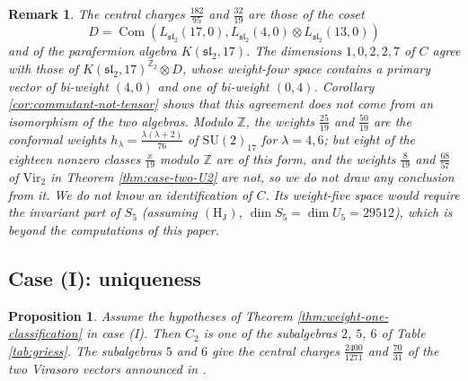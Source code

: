 \documentclass[leqno]{article}
\newcommand{\Z}{\ensuremath{\mathbb{Z}}}
\newcommand{\ot}{\otimes}
\newtheorem{prop}[thm]{Proposition}
\newtheorem{remark}[thm]{Remark}
\numberwithin{equation}{section}
\begin{document}
\begin{remark}\normalfont
\label{rem:commutant-cosets}
The central charges $\frac{182}{95}$ and $\frac{32}{19}$ are those of the coset
\[
D = \operatorname{Com}(L_{\mathfrak{sl}_2}(17,0), L_{\mathfrak{sl}_2}(4,0) \ot L_{\mathfrak{sl}_2}(13,0))
\]
and of the parafermion algebra $K(\mathfrak{sl}_2,17)$. The dimensions $1, 0, 2, 2, 7$ of $C$ agree with those of $K(\mathfrak{sl}_2,17)^{\Z_2} \ot D$, whose weight-four space contains a primary vector of bi-weight $(4,0)$ and one of bi-weight $(0,4)$. Corollary \ref{cor:commutant-not-tensor} shows that this agreement does not come from an isomorphism of the two algebras. Modulo $\Z$, the weights $\frac{25}{19}$ and $\frac{50}{19}$ are the conformal weights $h_\lambda = \frac{\lambda(\lambda+2)}{76}$ of $\mathrm{SU}(2)_{17}$ for $\lambda = 4, 6$; but eight of the eighteen nonzero classes $\frac{x}{19}$ modulo $\Z$ are of this form, and the weights $\frac{8}{19}$ and $\frac{68}{57}$ of $\mathrm{Vir}_2$ in Theorem \ref{thm:case-two-U2} are not, so we do not draw any conclusion from it. We do not know an identification of $C$. Its weight-five space would require the invariant part of $S_5$ (assuming $\mathrm{(H_J)}$, $\dim S_5 = \dim U_5 = 29512$), which is beyond the computations of this paper.
\end{remark}


\subsection{Case (I): uniqueness}
\label{subsec:case-one}

\begin{prop}
\label{prop:case-one-control}
Assume the hypotheses of Theorem \ref{thm:weight-one-classification} in case (I). Then $C_2$ is one of the subalgebras $2$, $5$, $6$ of Table \ref{tab:griess}. The subalgebras $5$ and $6$ give the central charges $\frac{2400}{1271}$ and $\frac{70}{31}$ of the two Virasoro vectors announced in \cite[Section 1]{Rie26b}.
\end{prop}
\end{document}
